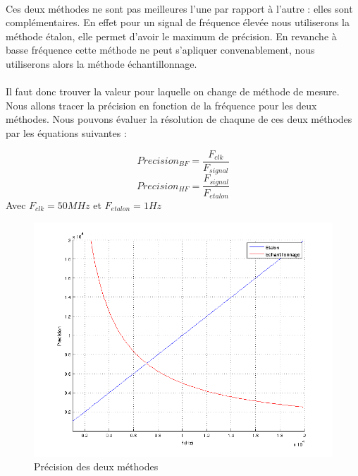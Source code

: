 \documentclass[a4paper,11pt]{article}
\begin{document}
  \paragraph{} Ces deux méthodes ne sont pas meilleures l'une par rapport à l'autre : elles sont complémentaires.
  En effet pour un signal de fréquence élevée nous utiliserons la méthode étalon, elle permet d'avoir le maximum de précision.
  En revanche à basse fréquence cette méthode ne peut s'apliquer convenablement, nous utiliserons alors la méthode échantillonnage.

  \paragraph{}Il faut donc trouver la valeur pour laquelle on change de méthode de mesure. Nous allons tracer la précision en fonction de la fréquence pour 
  les deux méthodes. Nous pouvons évaluer la résolution de chaqune de ces deux méthodes par les équations suivantes :

  \begin{equation*}
  Precision_{BF}= \frac{F_{clk}}{F_{signal}}
  \end{equation*}
  \begin{equation*}
  Precision_{HF}= \frac{F_{signal}}{F_{etalon}}
  \end{equation*}
Avec $F_{clk}=50 MHz$ et $F_{etalon}=1Hz$
\begin{figure}[H]
\begin{center}
	\includegraphics[scale=.7]{graphMethode.png}
	\caption{Précision des deux méthodes}
\end{center}
\end{figure}
\end{document}
